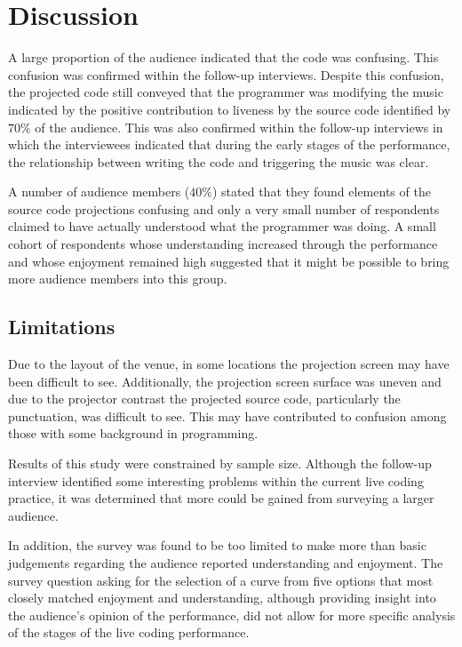\section{Discussion}

A large proportion of the audience indicated that the code was confusing. This confusion was confirmed within the follow-up interviews. Despite this confusion, the projected code still conveyed that the programmer was modifying the music indicated by the positive contribution to liveness by the source code identified by $70\%$ of the audience. This was also confirmed within the follow-up interviews in which the interviewees indicated that during the early stages of the performance, the relationship between writing the code and triggering the music was clear.

A number of audience members ($40\%$) stated that they found elements of the source code projections confusing and only a very small number of respondents claimed to have actually understood what the programmer was doing. A small cohort of respondents whose understanding increased through the performance and whose enjoyment remained high suggested that it might be possible to bring more audience members into this group.

\subsection{Limitations}

Due to the layout of the venue, in some locations the projection screen may have been difficult to see. Additionally, the projection screen surface was uneven and due to the projector contrast the projected source code, particularly the punctuation, was difficult to see. This may have contributed to confusion among those with some background in programming.

Results of this study were constrained by sample size. Although the follow-up interview identified some interesting problems within the current live coding practice, it was determined that more could be gained from surveying a larger audience.

In addition, the survey was found to be too limited to make more than basic judgements regarding the audience reported understanding and enjoyment. The survey question asking for the selection of a curve from five options that most closely matched enjoyment and understanding, although providing insight into the audience's opinion of the performance, did not allow for more specific analysis of the stages of the live coding performance.

